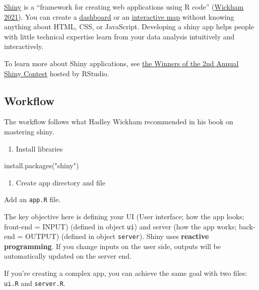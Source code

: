 \documentclass[
]{book}
\newenvironment{Shaded}{\begin{snugshade}}{\end{snugshade}}
\newcommand{\FunctionTok}[1]{\textcolor[rgb]{0.00,0.00,0.00}{#1}}
\newcommand{\NormalTok}[1]{#1}
\newcommand{\StringTok}[1]{\textcolor[rgb]{0.31,0.60,0.02}{#1}}
\providecommand{\tightlist}{%
  \setlength{\itemsep}{0pt}\setlength{\parskip}{0pt}}
\begin{document}
\href{https://shiny.rstudio.com/}{Shiny} is a ``framework for creating web applications using R code'' (\href{https://mastering-shiny.org/}{Wickham 2021}). You can create a \href{https://rstudio.github.io/shinydashboard/}{dashboard} or an \href{https://rviews.rstudio.com/2019/10/09/building-interactive-world-maps-in-shiny/}{interactive map} without knowing anything about HTML, CSS, or JavaScript. Developing a shiny app helps people with little technical expertise learn from your data analysis intuitively and interactively.

To learn more about Shiny applications, see \href{https://blog.rstudio.com/2020/07/13/winners-of-the-2nd-shiny-contest/}{the Winners of the 2nd Annual Shiny Contest} hosted by RStudio.

\hypertarget{workflow-1}{%
\subsection{Workflow}\label{workflow-1}}

The workflow follows what Hadley Wickham recommended in his book on mastering shiny.

\begin{enumerate}
\def\labelenumi{\arabic{enumi}.}
\tightlist
\item
  Install libraries
\end{enumerate}

\begin{Shaded}
\begin{Highlighting}[]
\FunctionTok{install.packages}\NormalTok{(}\StringTok{"shiny"}\NormalTok{)}
\end{Highlighting}
\end{Shaded}

\begin{enumerate}
\def\labelenumi{\arabic{enumi}.}
\setcounter{enumi}{1}
\tightlist
\item
  Create app directory and file
\end{enumerate}

Add an \texttt{app.R} file.

The key objective here is defining your UI (User interface; how the app looks; front-end = INPUT) (defined in object \texttt{ui}) and server (how the app works; back-end = OUTPUT) (defined in object \texttt{server}). Shiny uses \textbf{reactive programming}. If you change inputs on the user side, outputs will be automatically updated on the server end.

If you're creating a complex app, you can achieve the same goal with two files: \texttt{ui.R} and \texttt{server.R}.
\end{document}
